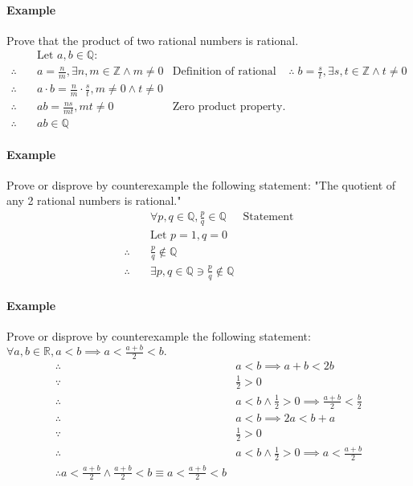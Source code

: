 \paragraph*{Example}
Prove that the product of two rational numbers is rational.
\begin{align*}
    &\text{Let } a,b \in \mathbb{Q}:\\
    \therefore \quad & a = \frac{n}{m}, \exists n,m \in \mathbb{Z} \land m \neq 0 & \text{Definition of rational numbers.}
    \therefore \quad & b = \frac{s}{t}, \exists s,t \in \mathbb{Z} \land t \neq 0\\
    \therefore \quad & a \cdot b = \frac{n}{m} \cdot \frac{s}{t}, m \neq 0 \land t \neq 0\\
    \therefore \quad & ab = \frac{ns}{mt}, mt \neq 0 & \text{Zero product property.}\\
    \therefore \quad & ab \in \mathbb{Q}
\end{align*}

\paragraph*{Example}
Prove or disprove by counterexample the following statement: "The quotient of any 2 rational numbers is rational."
\begin{align*}
    & \forall p,q \in \mathbb{Q}, \frac{p}{q} \in \mathbb{Q} & \text{Statement}\\
    & \text{Let } p=1,q=0\\
    \therefore \quad & \frac{p}{q} \notin \mathbb{Q}\\
    \therefore \quad & \exists p,q \in \mathbb{Q} \ni \frac{p}{q} \notin \mathbb{Q}
\end{align*}

\paragraph*{Example}
Prove or disprove by counterexample the following statement: $\forall a,b \in \mathbb{R}, a<b \implies a<\frac{a+b}{2}<b.$
\begin{align*}
    \therefore \quad & a < b \implies a + b < 2b\\
    \because \quad & \frac{1}{2} > 0\\
    \therefore \quad & a < b \land \frac{1}{2} > 0 \implies \frac{a+b}{2} < \frac{b}{2}\\
    \therefore \quad & a < b \implies 2a < b + a\\
    \because \quad & \frac{1}{2} > 0\\
    \therefore \quad & a < b \land \frac{1}{2} > 0 \implies a < \frac{a+b}{2}\\
    \therefore a < \frac{a+b}{2} \land \frac{a+b}{2} < b \equiv a < \frac{a+b}{2} < b\\
\end{align*}
